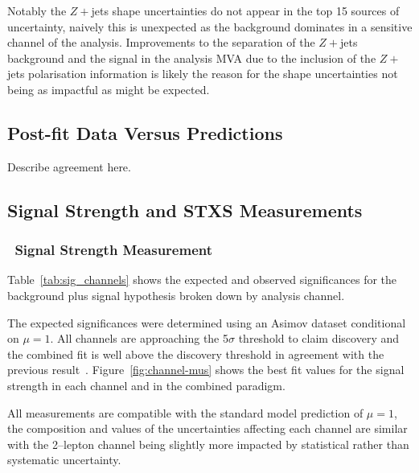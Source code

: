 Notably the $Z+$jets shape uncertainties do not appear in the top 15 sources of
uncertainty, naively this is unexpected as the background dominates in a
sensitive channel of the analysis. Improvements to the separation of the
$Z+$jets background and the signal in the analysis MVA due to the inclusion of
the $Z+$jets polarisation information is likely the reason for the shape
uncertainties not being as impactful as might be expected. 

\subsection{Post-fit Data Versus Predictions}
Describe agreement here.







\clearpage

\subsection{Signal Strength and STXS Measurements}

% 

\subsubsection{\VH\ Signal Strength Measurement}
Table~\ref{tab:sig_channels} shows the expected and observed significances for
the background plus signal hypothesis broken down by analysis channel.

The expected significances were determined using an Asimov dataset conditional
on $\mu=1$. All channels are approaching the 5$\sigma$ threshold to claim
discovery and the combined fit is well above the discovery threshold in
agreement with the previous result~\cite{vhbb-obs}. Figure~\ref{fig:channel-mus}
shows the best fit values for the signal strength in each channel and in the
combined paradigm.

All measurements are compatible with the standard model prediction of $\mu=1$,
the composition and values of the uncertainties affecting each channel are
similar with the 2--lepton channel being slightly more impacted by statistical
rather than systematic uncertainty.
%
\clearpage
